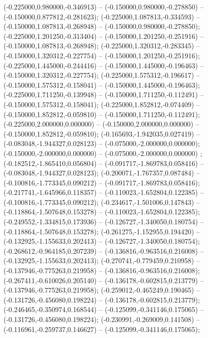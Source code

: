  (-0.225000,0.980000,-0.346913) -- (-0.150000,0.980000,-0.278850) -- (-0.150000,0.877812,-0.281623);
 (-0.225000,1.087813,-0.334593) -- (-0.150000,1.087813,-0.268948) -- (-0.150000,0.980000,-0.278850);
 (-0.225000,1.201250,-0.313404) -- (-0.150000,1.201250,-0.251916) -- (-0.150000,1.087813,-0.268948);
 (-0.225000,1.320312,-0.283345) -- (-0.150000,1.320312,-0.227754) -- (-0.150000,1.201250,-0.251916);
 (-0.225000,1.445000,-0.244416) -- (-0.150000,1.445000,-0.196463) -- (-0.150000,1.320312,-0.227754);
 (-0.225000,1.575312,-0.196617) -- (-0.150000,1.575312,-0.158041) -- (-0.150000,1.445000,-0.196463);
 (-0.225000,1.711250,-0.139948) -- (-0.150000,1.711250,-0.112491) -- (-0.150000,1.575312,-0.158041);
 (-0.225000,1.852812,-0.074409) -- (-0.150000,1.852812,-0.059810) -- (-0.150000,1.711250,-0.112491);
 (-0.225000,2.000000,0.000000) -- (-0.150000,2.000000,0.000000) -- (-0.150000,1.852812,-0.059810);
 (-0.165693,-1.942035,0.027419) -- (-0.083048,-1.944327,0.028123) -- (-0.075000,-2.000000,0.000000);
 (-0.150000,-2.000000,0.000000) -- (-0.075000,-2.000000,0.000000) ;
 (-0.182512,-1.865410,0.056804) -- (-0.091717,-1.869783,0.058416) -- (-0.083048,-1.944327,0.028123);
 (-0.200071,-1.767357,0.087484) -- (-0.100816,-1.773345,0.090212) -- (-0.091717,-1.869783,0.058416);
 (-0.217741,-1.645966,0.118357) -- (-0.110023,-1.652804,0.122385) -- (-0.100816,-1.773345,0.090212);
 (-0.234617,-1.501006,0.147843) -- (-0.118864,-1.507648,0.153278) -- (-0.110023,-1.652804,0.122385);
 (-0.249552,-1.334815,0.173936) -- (-0.126727,-1.340050,0.180754) -- (-0.118864,-1.507648,0.153278);
 (-0.261275,-1.152955,0.194420) -- (-0.132925,-1.155633,0.202413) -- (-0.126727,-1.340050,0.180754);
 (-0.268612,-0.964185,0.207239) -- (-0.136816,-0.963516,0.216008) -- (-0.132925,-1.155633,0.202413);
 (-0.270741,-0.779459,0.210958) -- (-0.137946,-0.775263,0.219958) -- (-0.136816,-0.963516,0.216008);
 (-0.267411,-0.610026,0.205140) -- (-0.136178,-0.602815,0.213779) -- (-0.137946,-0.775263,0.219958);
 (-0.259012,-0.465249,0.190465) -- (-0.131726,-0.456080,0.198224) -- (-0.136178,-0.602815,0.213779);
 (-0.246465,-0.350974,0.168544) -- (-0.125099,-0.341146,0.175065) -- (-0.131726,-0.456080,0.198224);
 (-0.230991,-0.269009,0.141508) -- (-0.116961,-0.259737,0.146627) -- (-0.125099,-0.341146,0.175065);
